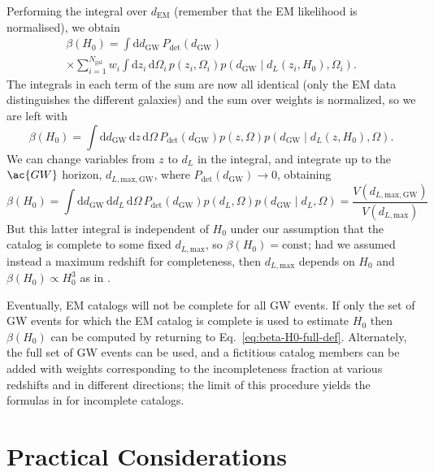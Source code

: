 \documentclass[modern]{aastex62}
\newcommand{\dd}{\mathrm{d}}
\newcommand{\dEM}{d_{\mathrm{EM}}}
\newcommand{\dGW}{d_{\mathrm{GW}}}
\newcommand{\Ngal}{N_{\mathrm{gal}}}
\newcommand{\Pdet}{P_{\mathrm{det}}}
\begin{document}
Performing the integral over $\dEM$ (remember that the \ac{EM} likelihood is
normalised), we obtain
%
\begin{multline}
    \beta\left( H_0 \right) =  \int \dd \dGW \, \Pdet\left( \dGW \right) \\ \times \sum_{i=1}^{\Ngal} w_i \int \dd z_i \, \dd \Omega_i \, p\left( z_i, \Omega_i \right) p\left( \dGW \mid d_L\left( z_i, H_0 \right), \Omega_i \right).
\end{multline}
%
The integrals in each term of the sum are now all identical (only the \ac{EM}
data distinguishes the different galaxies) and the sum over weights is
normalized, so we are left with
%
\begin{equation}
     \beta\left( H_0 \right) =  \int \dd \dGW \, \dd z \, \dd \Omega \, \Pdet\left( \dGW \right)  p\left( z, \Omega \right) p\left( \dGW \mid d_L\left( z, H_0 \right), \Omega \right).
\end{equation}
%
We can change variables from $z$ to $d_L$ in the integral, and integrate up to
the $\ac{GW}$ horizon, $d_{L,\mathrm{max},\mathrm{GW}}$, where $\Pdet\left( \dGW
\right) \to 0$, obtaining
%
\begin{equation}
    \beta\left( H_0 \right) =  \int \dd \dGW \, \dd d_L \, \dd \Omega \, \Pdet\left( \dGW \right)  p\left( d_L, \Omega \right) p\left( \dGW \mid d_L, \Omega \right) = \frac{V \left( d_{L,\mathrm{max},\mathrm{GW}} \right)}{V\left( d_{L,\mathrm{max}} \right)}
\end{equation}
%
But this latter integral is independent of $H_0$ under our assumption that the
catalog is complete to some fixed $d_{L, \mathrm{max}}$, so $\beta\left( H_0
\right) = \mathrm{const}$; had we assumed instead a maximum redshift for
completeness, then $d_{L, \mathrm{max}}$ depends on $H_0$ and $\beta\left( H_0
\right) \propto H_0^3$ as in \citet{Fishbach2018}.

Eventually, \ac{EM} catalogs will not be complete for all \ac{GW} events.  If
only the set of \ac{GW} events for which the \ac{EM} catalog is complete is used
to estimate $H_0$ then $\beta\left( H_0 \right)$ can be computed by returning to
Eq.\ \eqref{eq:beta-H0-full-def}.  Alternately, the full set of \ac{GW} events
can be used, and a fictitious catalog members can be added with weights
corresponding to the incompleteness fraction at various redshifts and in
different directions; the limit of this procedure yields the formulas in
\citet{Fishbach2018} for incomplete catalogs.

\section{Practical Considerations}
\end{document}
